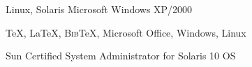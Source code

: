 \documentclass[10pt]{article}
\renewcommand{\section}[2]%
        {\pagebreak[2]\vspace{1.4\baselineskip}%
         \phantomsection\addcontentsline{toc}{section}{#1}%
         \hspace{0in}%
         \marginpar{
         \raggedright \scshape #1}#2}
\renewcommand{\subsection}[2]%
        {\pagebreak[2]\vspace{0.3\baselineskip}%
         \phantomsection\addcontentsline{toc}{subsection}{#1}%
         \hspace{0in}%
         \marginpar{\scriptsize
         \raggedright \scshape #1}#2}
\newcommand{\blankline}{\quad\pagebreak[2]}
\begin{document}
\blankline

  Linux, Solaris
Microsoft Windows XP/2000

\blankline


\blankline

\TeX{}, \LaTeX{}, B\textsc{ib}\TeX{}, Microsoft Office,
Windows,
 Linux

Sun Certified System Administrator for Solaris 10 OS
\end{document}
